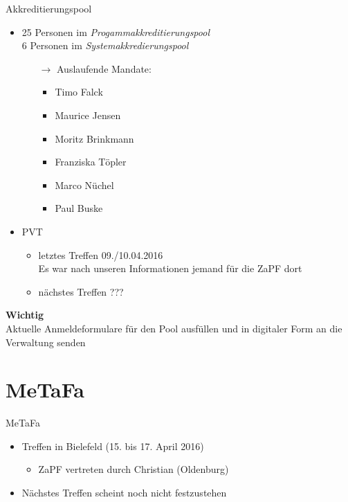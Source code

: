 \documentclass[compress, aspectratio=169]{beamer}
\begin{document}
\begin{frame}{Akkreditierungspool}
	\begin{itemize}
		\item 25 Personen im \emph{Progammakkreditierungspool}\\
			6 Personen im \emph{Systemakkredierungspool}
			\begin{itemize}
				\item[$\rightarrow$] Auslaufende Mandate:
					\begin{itemize}
						\item Timo Falck
						\item Maurice Jensen
						\item Moritz Brinkmann
						\item Franziska Töpler
						\item Marco Nüchel
						\item Paul Buske
					\end{itemize}
			\end{itemize}
		\item PVT
			\begin{itemize}
				\item letztes Treffen 09./10.04.2016 \\
					Es war nach unseren Informationen jemand für die ZaPF dort
				\item nächstes Treffen ???
			\end{itemize}
	\end{itemize}
\end{frame}

\begin{frame}
	\begin{framed}
		\begin{center}
			{\Huge \textbf{Wichtig}}\\
			\vspace{0.5cm}
			{\Large Aktuelle Anmeldeformulare für den Pool ausfüllen und in digitaler Form an die Verwaltung senden}
		\end{center}
	\end{framed}
\end{frame}

\section{MeTaFa}

\begin{frame}{MeTaFa}
	\begin{itemize}
		\item Treffen in Bielefeld (15. bis 17. April 2016)
			\begin{itemize}
				\item ZaPF vertreten durch Christian (Oldenburg)
			\end{itemize}
		\item Nächstes Treffen scheint noch nicht festzustehen
	\end{itemize}
\end{frame}
\end{document}
